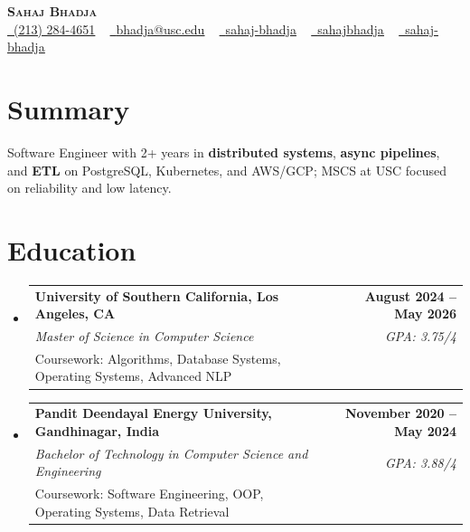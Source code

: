 \documentclass[letterpaper,10pt]{article}
\makeatletter
\newcommand{\resumeEduSubheading}[5]{\vspace{-1pt}\item\begin{tabular*}{1.0\textwidth}[t]{l@{\extracolsep{\fill}}r}\textbf{#1} & \textbf{\small #2} \\\textit{\small #3} & \textit{\small #4} \\\small #5 & \\\end{tabular*}\vspace{-4pt}}
\newcommand{\resumeSubHeadingListStart}{\begin{itemize}[leftmargin=0.0in, label={}]}
\newcommand{\resumeSubHeadingListEnd}{\end{itemize}}
\makeatother
\begin{document}
\begin{center}
{\Huge \scshape \textbf{Sahaj Bhadja}} \\ \vspace{1pt}
\small \href{tel:(213) 284-4651}{\faPhone\ \underline{(213) 284-4651}} ~ \href{mailto: bhadja@usc.edu}{\raisebox{-0.2\height}\faEnvelope\ \underline{bhadja@usc.edu}} ~
\href{https://www.linkedin.com/in/sahaj-bhadja/}{\raisebox{-0.2\height}\faLinkedin\ \underline{sahaj-bhadja}} ~ \href{https://github.com/SAHAJ-BHADJA}{\raisebox{-0.2\height}\faGithub\ \underline{sahajbhadja}} ~
\href{https://sahaj-bhadja.vercel.app/}{\raisebox{-0.2\height}\faGlobe\ \underline{sahaj-bhadja}}
\end{center}
\vspace{-16pt}
\section{Summary}
\begin{itemize}[leftmargin=0.15in, label={}]
\small{\item{Software Engineer with 2+ years in \textbf{distributed systems}, \textbf{async pipelines}, and \textbf{ETL} on PostgreSQL, Kubernetes, and AWS/GCP; MSCS at USC focused on reliability and low latency.}}
\end{itemize}
\vspace{-6pt}
\section{Education}
\resumeSubHeadingListStart
\resumeEduSubheading{University of Southern California, Los Angeles, CA}{August 2024 -- May 2026}{Master of Science in Computer Science}{GPA: 3.75/4}{Coursework: Algorithms, Database Systems, Operating Systems, Advanced NLP}
\vspace{-9pt}
\resumeEduSubheading{Pandit Deendayal Energy University, Gandhinagar, India}{November 2020 -- May 2024}{Bachelor of Technology in Computer Science and Engineering}{GPA: 3.88/4}{Coursework: Software Engineering, OOP, Operating Systems, Data Retrieval}
\resumeSubHeadingListEnd
\vspace{-6pt}
\end{document}
